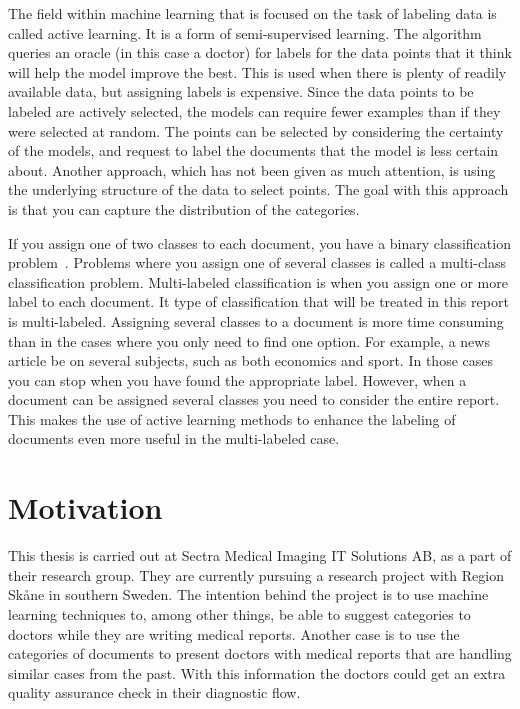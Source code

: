 The field within machine learning that is focused on the task of labeling data is called active learning.
It is a form of semi-supervised learning.
The algorithm queries an oracle (in this case a doctor) for labels for the data points that it think will help the model improve the best.
This is used when there is plenty of readily available data, but assigning labels is expensive.
Since the data points to be labeled are actively selected, the models can require fewer examples than if they were selected at random.
The points can be selected by considering the certainty of the models, and request to label the documents that the model is less certain about.
Another approach, which has not been given as much attention, is using the underlying structure of the data to select points.
The goal with this approach is that you can capture the distribution of the categories.

If you assign one of two classes to each document, you have a binary classification problem~\cite{bishop2006pattern}.
Problems where you assign one of several classes is called a multi-class classification problem.
Multi-labeled classification is when you assign one or more label to each document.
It type of classification that will be treated in this report is multi-labeled.
Assigning several classes to a document is more time consuming than in the cases where you only need to find one option.
For example, a news article be on several subjects, such as both economics and sport.
In those cases you can stop when you have found the appropriate label.
However, when a document can be assigned several classes you need to consider the entire report.
This makes the use of active learning methods to enhance the labeling of documents even more useful in the multi-labeled case.  
\section{Motivation}
\label{sec:motivation}

This thesis is carried out at Sectra Medical Imaging IT Solutions AB, as a part of their research group.
They are currently pursuing a research project with Region Skåne in southern Sweden.
The intention behind the project is to use machine learning techniques to, among other things, be able to suggest categories to doctors while they are writing medical reports.
Another case is to use the categories of documents to present doctors with medical reports that are handling similar cases from the past.
With this information the doctors could get an extra quality assurance check in their diagnostic flow.

